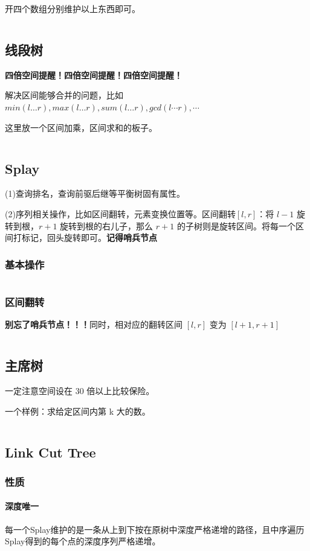 \documentclass[a4paper,11pt]{article}
\begin{document}
开四个数组分别维护以上东西即可。
\inputminted[linenos,breaklines]{c++}{structure/treearray5.cpp}
\subsection{线段树}
\textbf{四倍空间提醒！四倍空间提醒！四倍空间提醒！}

解决区间能够合并的问题，比如
\(min(l\dots r),max(l\dots r),sum(l\dots r),gcd(l\cdots r),\cdots\)

这里放一个区间加乘，区间求和的板子。
\inputminted[linenos]{c++}{structure/sgt.cpp}

\subsection{Splay}
(1)查询排名，查询前驱后继等平衡树固有属性。

(2)序列相关操作，比如区间翻转，元素变换位置等。区间翻转\([l,r]\)：将
\(l-1\) 旋转到根，\(r+1\) 旋转到根的右儿子，那么 \(r+1\)
的子树则是旋转区间。将每一个区间打标记，回头旋转即可。\textbf{记得哨兵节点}
\subsubsection{基本操作}
\inputminted[linenos]{c++}{structure/splay2.cpp}
\subsubsection{区间翻转}
\textbf{别忘了哨兵节点！！！}同时，相对应的翻转区间 \([l,r]\) 变为 \([l+1,r+1]\)
\inputminted[linenos]{c++}{structure/splay3.cpp}

\subsection{主席树}
一定注意空间设在 30 倍以上比较保险。

一个样例：求给定区间内第 k 大的数。
\inputminted[linenos]{c++}{structure/zhuxitree.cpp}

\subsection{Link Cut Tree}
\subsubsection{性质}
\paragraph{深度唯一}
每一个Splay维护的是一条从上到下按在原树中深度严格递增的路径，且中序遍历Splay得到的每个点的深度序列严格递增。
\end{document}
